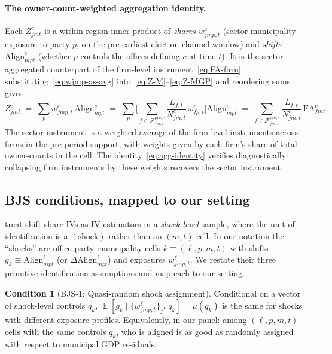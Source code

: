 \documentclass{article}
\newcommand{\Align}{\mathrm{Align}}
\newcommand{\FA}{\mathrm{FA}}
\newcommand{\cF}{\mathcal{F}}
\DeclareMathOperator{\E}{\mathbb{E}}
\theoremstyle{plain}
\theoremstyle{definition}
\newtheorem{condition}{Condition}
\theoremstyle{remark}
\begin{document}
\paragraph{The owner-count-weighted aggregation identity.}
Each $Z^{c}_{jmt}$ is a within-region inner product of \emph{shares}
$w^{c}_{jmp,t}$ (sector-municipality exposure to party $p$, on
the pre-earliest-election channel window) and \emph{shifts}
$\Align^{c}_{mpt}$ (whether $p$ controls the offices defining $c$ at
time $t$). It is the
sector-aggregated counterpart of the firm-level
instrument~\eqref{eq:FA-firm}: substituting~\eqref{eq:wjmp-as-avg}
into~\eqref{eq:Z-M}--\eqref{eq:Z-MGP} and reordering sums gives
\begin{equation}\label{eq:agg-identity}
  Z^{c}_{jmt}
  \;=\;
  \sum_{p} w^{c}_{jmp,t}\,\Align^{c}_{mpt}
  \;=\;
  \sum_{p}\Bigg[\sum_{f\in\cF^{\mathrm{pre},c}_{jm,t}}
       \frac{L_{f,t}}{N^{c}_{jm,t}}\,\omega^{c}_{fp,t}\Bigg]
       \Align^{c}_{mpt}
  \;=\;
  \sum_{f\in\cF^{\mathrm{pre},c}_{jm,t}}
       \frac{L_{f,t}}{N^{c}_{jm,t}}\,\FA^{c}_{fmt}.
\end{equation}
The sector instrument is a weighted average of the firm-level
instruments across firms in the pre-period support, with weights given
by each firm's share of total owner-counts in the cell. The
identity~\eqref{eq:agg-identity} verifies diagnostically: collapsing
firm instruments by these weights recovers the sector instrument.


\subsection{BJS conditions, mapped to our setting}

\citet{borusyak2022quasi} treat shift-share IVs as IV estimators in a
\emph{shock-level} sample, where the unit of identification is a
$(\text{shock})$ rather than an $(m,t)$ cell. In our notation the
``shocks'' are office-party-municipality cells $k\equiv(\ell,p,m,t)$ with
shifts $g_k\equiv\Align^{\ell}_{mpt}$ (or $\Delta\Align^{\ell}_{mpt}$) and
exposures $w^{\ell}_{jmp,t}$. We restate their three primitive identification
assumptions and map each to our setting.

\begin{condition}[BJS-1: Quasi-random shock assignment]\label{cond:BJS1}
Conditional on a vector of shock-level controls $q_k$,
\(
  \E[g_k \mid \{w^{\ell}_{jmp,t}\}_{j},\, q_k] = \mu(q_k)
\)
is the same for shocks with different exposure profiles. Equivalently, in our
panel: among $(\ell,p,m,t)$ cells with the same controls $q_k$, who is aligned
is as good as randomly assigned with respect to municipal GDP residuals.
\end{condition}
\end{document}
